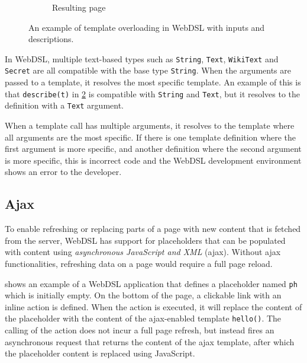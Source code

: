 \begin{figure}
\begin{subfigure}[t]{0.55\textwidth}
          \caption{\label{fig:webdsl-template-overloading-page}Resulting page}
        \end{subfigure}
      \caption{\label{fig:webdsl-template-overloading}An example of template overloading in WebDSL with inputs and descriptions.}
      \end{figure}

      In WebDSL, multiple text-based types such as \texttt{String}, \texttt{Text}, \texttt{WikiText} and \texttt{Secret} are all compatible with the base type \texttt{String}. When the arguments are passed to a template, it resolves the most specific template. An example of this is that \texttt{describe(t)} in \cref{fig:webdsl-template-overloading} is compatible with \texttt{String} and \texttt{Text}, but it resolves to the definition with a \texttt{Text} argument.

      When a template call has multiple arguments, it resolves to the template where all arguments are the most specific. If there is one template definition where the first argument is more specific, and another definition where the second argument is more specific, this is incorrect code and the WebDSL development environment shows an error to the developer.

    \subsection{\label{subsec:ajax}Ajax}

      To enable refreshing or replacing parts of a page with new content that is fetched from the server, WebDSL has support for placeholders that can be populated with content using \textit{asynchronous JavaScript and XML} (ajax). Without ajax functionalities, refreshing data on a page would require a full page reload.

       shows an example of a WebDSL application that defines a placeholder named \texttt{ph} which is initially empty. On the bottom of the page, a clickable link with an inline action is defined. When the action is executed, it will replace the content of the placeholder with the content of the ajax-enabled template \texttt{hello()}. The calling of the action does not incur a full page refresh, but instead fires an asynchronous request that returns the content of the ajax template, after which the placeholder content is replaced using JavaScript.


